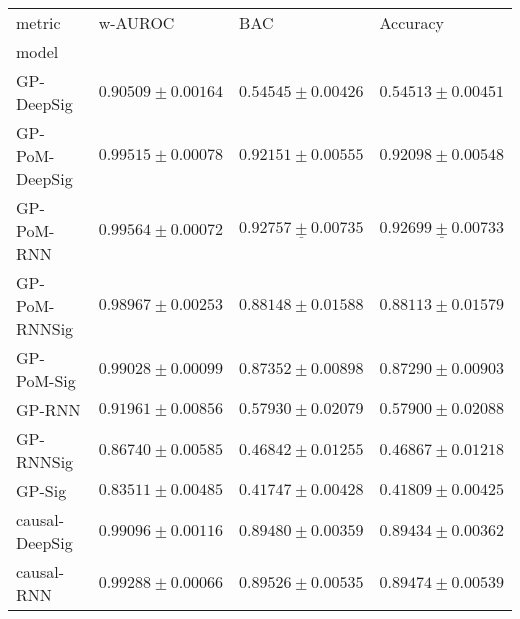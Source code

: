 \begin{tabular}{llll}
\toprule
metric &                                           w-AUROC &                                               BAC &                                          Accuracy \\
model          &                                                   &                                                   &                                                   \\
\midrule
GP-DeepSig     &                           $ 0.90509 \pm 0.00164 $ &                           $ 0.54545 \pm 0.00426 $ &                           $ 0.54513 \pm 0.00451 $ \\
GP-PoM-DeepSig &                           $ 0.99515 \pm 0.00078 $ &                           $ 0.92151 \pm 0.00555 $ &                           $ 0.92098 \pm 0.00548 $ \\
GP-PoM-RNN     &                           $ 0.99564 \pm 0.00072 $ &            $  \underline{ 0.92757 \pm 0.00735 } $ &            $  \underline{ 0.92699 \pm 0.00733 } $ \\
GP-PoM-RNNSig  &                           $ 0.98967 \pm 0.00253 $ &                           $ 0.88148 \pm 0.01588 $ &                           $ 0.88113 \pm 0.01579 $ \\
GP-PoM-Sig     &                           $ 0.99028 \pm 0.00099 $ &                           $ 0.87352 \pm 0.00898 $ &                           $ 0.87290 \pm 0.00903 $ \\
GP-RNN         &                           $ 0.91961 \pm 0.00856 $ &                           $ 0.57930 \pm 0.02079 $ &                           $ 0.57900 \pm 0.02088 $ \\
GP-RNNSig      &                           $ 0.86740 \pm 0.00585 $ &                           $ 0.46842 \pm 0.01255 $ &                           $ 0.46867 \pm 0.01218 $ \\
GP-Sig         &                           $ 0.83511 \pm 0.00485 $ &                           $ 0.41747 \pm 0.00428 $ &                           $ 0.41809 \pm 0.00425 $ \\
causal-DeepSig &                           $ 0.99096 \pm 0.00116 $ &                           $ 0.89480 \pm 0.00359 $ &                           $ 0.89434 \pm 0.00362 $ \\
causal-RNN     &                           $ 0.99288 \pm 0.00066 $ &                           $ 0.89526 \pm 0.00535 $ &                           $ 0.89474 \pm 0.00539 $ \\

\end{tabular}
